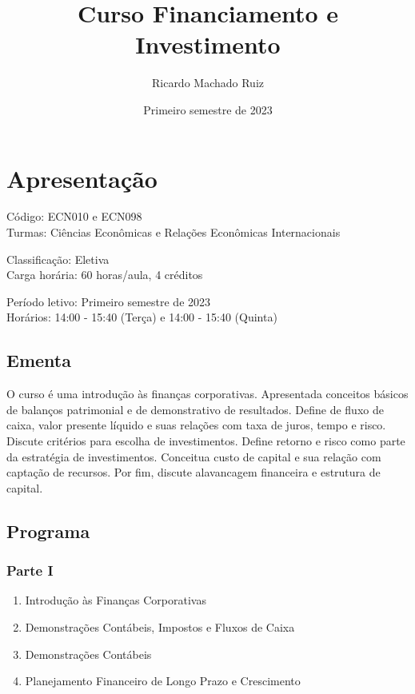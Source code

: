 \documentclass[
]{book}
\title{Curso Financiamento e Investimento}
\author{Ricardo Machado Ruiz}
\date{Primeiro semestre de 2023}
\providecommand{\tightlist}{%
  \setlength{\itemsep}{0pt}\setlength{\parskip}{0pt}}
\theoremstyle{definition}
\theoremstyle{definition}
\theoremstyle{definition}
\theoremstyle{definition}
\theoremstyle{remark}
\begin{document}
\maketitle

{
\setcounter{tocdepth}{1}
\tableofcontents
}
\hypertarget{apresentauxe7uxe3o}{%
\chapter{Apresentação}\label{apresentauxe7uxe3o}}

Código: ECN010 e ECN098\\
Turmas: Ciências Econômicas e Relações Econômicas Internacionais

Classificação: Eletiva\\
Carga horária: 60 horas/aula, 4 créditos

Período letivo: Primeiro semestre de 2023\\
Horários: 14:00 - 15:40 (Terça) e 14:00 - 15:40 (Quinta)

\hypertarget{ementa}{%
\section{Ementa}\label{ementa}}

O curso é uma introdução às finanças corporativas. Apresentada conceitos básicos de balanços patrimonial e de demonstrativo de resultados. Define de fluxo de caixa, valor presente líquido e suas relações com taxa de juros, tempo e risco. Discute critérios para escolha de investimentos. Define retorno e risco como parte da estratégia de investimentos. Conceitua custo de capital e sua relação com captação de recursos. Por fim, discute alavancagem financeira e estrutura de capital.

\hypertarget{programa}{%
\section{Programa}\label{programa}}

\hypertarget{parte-i}{%
\subsection{Parte I}\label{parte-i}}

\begin{enumerate}
\def\labelenumi{\arabic{enumi}.}
\tightlist
\item
  Introdução às Finanças Corporativas \citep{ross2013fundamentoscp1}\\
\item
  Demonstrações Contábeis, Impostos e Fluxos de Caixa \citep{ross2013fundamentoscp2}\\
\item
  Demonstrações Contábeis \citep{ross2013fundamentoscp3}\\
\item
  Planejamento Financeiro de Longo Prazo e Crescimento \citep{ross2013fundamentoscp4}
\end{enumerate}
\end{document}
